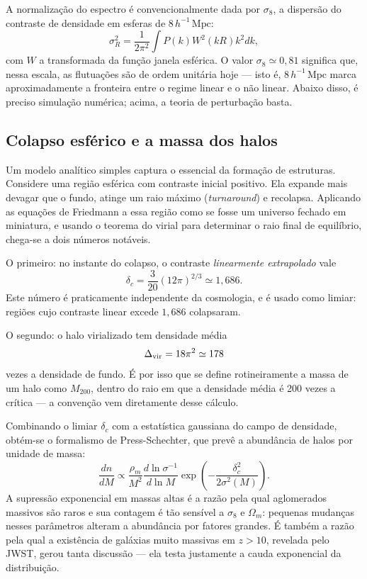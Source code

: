 \documentclass[11pt,a4paper]{article}
\begin{document}
A normalização do espectro é convencionalmente dada por $\sigma_8$, a dispersão do contraste de densidade em esferas de $8\,h^{-1}\,\mathrm{Mpc}$:
\[
\sigma_R^{2}=\frac{1}{2\pi^{2}}\int P(k)W^{2}(kR)k^{2}dk,
\]
com $W$ a transformada da função janela esférica. O valor $\sigma_8\simeq0{,}81$ significa que, nessa escala, as flutuações são de ordem unitária hoje --- isto é, $8\,h^{-1}\,\mathrm{Mpc}$ marca aproximadamente a fronteira entre o regime linear e o não linear. Abaixo disso, é preciso simulação numérica; acima, a teoria de perturbação basta.

\subsection*{Colapso esférico e a massa dos halos}

Um modelo analítico simples captura o essencial da formação de estruturas. Considere uma região esférica com contraste inicial positivo. Ela expande mais devagar que o fundo, atinge um raio máximo (\textit{turnaround}) e recolapsa. Aplicando as equações de Friedmann a essa região como se fosse um universo fechado em miniatura, e usando o teorema do virial para determinar o raio final de equilíbrio, chega-se a dois números notáveis.

O primeiro: no instante do colapso, o contraste \emph{linearmente extrapolado} vale
\[
\delta_c=\frac{3}{20}(12\pi)^{2/3}\simeq1{,}686.
\]
Este número é praticamente independente da cosmologia, e é usado como limiar: regiões cujo contraste linear excede $1{,}686$ colapsaram.

O segundo: o halo virializado tem densidade média
\[
\Delta_{\rm vir}=18\pi^{2}\simeq178
\]
vezes a densidade de fundo. É por isso que se define rotineiramente a massa de um halo como $M_{200}$, dentro do raio em que a densidade média é 200 vezes a crítica --- a convenção vem diretamente desse cálculo.

Combinando o limiar $\delta_c$ com a estatística gaussiana do campo de densidade, obtém-se o formalismo de Press-Schechter, que prevê a abundância de halos por unidade de massa:
\[
\frac{dn}{dM}\propto\frac{\rho_m}{M^{2}}\frac{d\ln\sigma^{-1}}{d\ln M}\exp\left(-\frac{\delta_c^{2}}{2\sigma^{2}(M)}\right).
\]
A supressão exponencial em massas altas é a razão pela qual aglomerados massivos são raros e sua contagem é tão sensível a $\sigma_8$ e $\Omega_m$: pequenas mudanças nesses parâmetros alteram a abundância por fatores grandes. É também a razão pela qual a existência de galáxias muito massivas em $z>10$, revelada pelo JWST, gerou tanta discussão --- ela testa justamente a cauda exponencial da distribuição.
\end{document}
